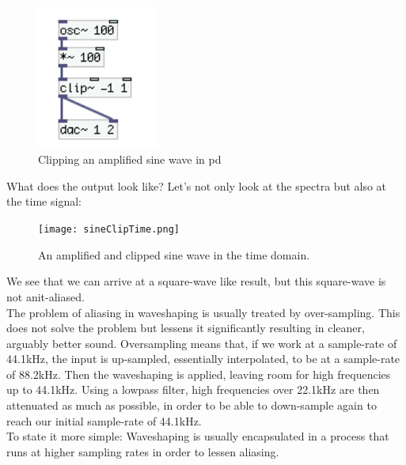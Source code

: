 \begin{figure}[H]
	\begin{center}
		\includegraphics[width = 4cm]{img/pdSineClipping.png}
		\caption{Clipping an amplified sine wave in pd}
		\label{fig:pdClipping}
	\end{center}
\end{figure}

What does the output look like? Let's not only look at the spectra but also at the time signal:


\begin{figure}[H]
	\begin{center}
		\texttt{[image: sineClipTime.png]}
		\caption{An amplified and clipped sine wave in the time domain.}
		\label{fig:timeClip}
	\end{center}
\end{figure}

We see that we can arrive at a square-wave like result, but this square-wave is not anit-aliased.\\

The problem of aliasing in waveshaping is usually treated by over-sampling. This does not solve the problem but lessens it significantly resulting in cleaner, arguably better sound. Oversampling means that, if we work at a sample-rate of 44.1kHz, the input is up-sampled, essentially interpolated, to be at a sample-rate of 88.2kHz. Then the waveshaping is applied, leaving room for high frequencies up to 44.1kHz. Using a lowpass filter, high frequencies over 22.1kHz are then attenuated as much as possible, in order to be able to down-sample again to reach our initial sample-rate of 44.1kHz. \\
To state it more simple: Waveshaping is usually encapsulated in a process that runs at higher sampling rates in order to lessen aliasing. 





